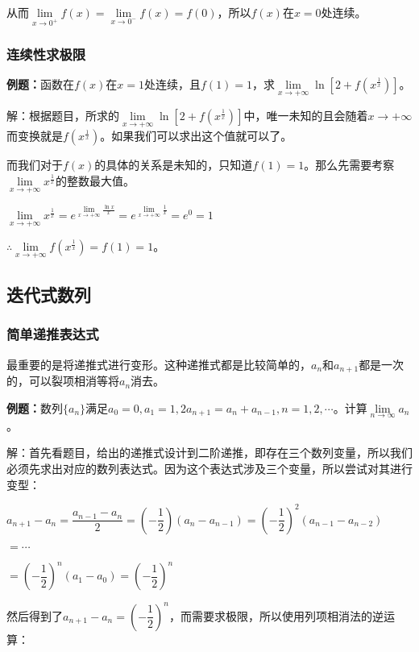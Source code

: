 从而$\lim\limits_{x\to 0^+}f(x)=\lim\limits_{x\to 0^-}f(x)=f(0)$，所以$f(x)$在$x=0$处连续。

\subsubsection{连续性求极限}

\textbf{例题：}函数在$f(x)$在$x=1$处连续，且$f(1)=1$，求$\lim\limits_{x\to+\infty}\ln\left[2+f\left(x^{\frac{1}{x}}\right)\right]$。

解：根据题目，所求的$\lim\limits_{x\to+\infty}\ln\left[2+f\left(x^{\frac{1}{x}}\right)\right]$中，唯一未知的且会随着$x\to+\infty$而变换就是$f\left(x^{\frac{1}{x}}\right)$。如果我们可以求出这个值就可以了。

而我们对于$f(x)$的具体的关系是未知的，只知道$f(1)=1$。那么先需要考察$\lim\limits_{x\to+\infty}x^{\frac{1}{x}}$的整数最大值。

$\lim\limits_{x\to+\infty}x^{\frac{1}{x}}=e^{\lim\limits_{x\to+\infty}\frac{\ln x}{x}}=e^{\lim\limits_{x\to+\infty}\frac{1}{x}}=e^0=1$

$\therefore\lim\limits_{x\to+\infty}f(x^{\frac{1}{x}})=f(1)=1$。

\subsection{迭代式数列}

\subsubsection{简单递推表达式}

最重要的是将递推式进行变形。这种递推式都是比较简单的，$a_n$和$a_{n+1}$都是一次的，可以裂项相消等将$a_n$消去。

\textbf{例题：}数列$\{a_n\}$满足$a_0=0,a_1=1,2a_{n+1}=a_n+a_{n-1},n=1,2,\cdots$。计算$\lim\limits_{n\to\infty}a_n$。

解：首先看题目，给出的递推式设计到二阶递推，即存在三个数列变量，所以我们必须先求出对应的数列表达式。因为这个表达式涉及三个变量，所以尝试对其进行变型：

$a_{n+1}-a_n=\dfrac{a_{n-1}-a_n}{2}=\left(-\dfrac{1}{2}\right)(a_n-a_{n-1})=\left(-\dfrac{1}{2}\right)^2(a_{n-1}-a_{n-2})$

$=\cdots$

$=\left(-\dfrac{1}{2}\right)^n(a_1-a_0)=\left(-\dfrac{1}{2}\right)^n$

然后得到了$a_{n+1}-a_n=\left(-\dfrac{1}{2}\right)^n$，而需要求极限，所以使用列项相消法的逆运算：

